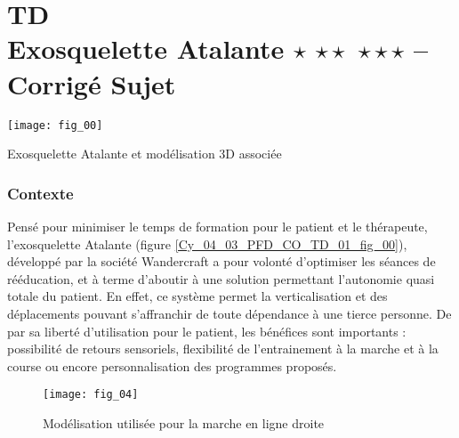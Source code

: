 \chapter*{TD  \\ 
Exosquelette Atalante  \ifnormal $\star$ \else \fi \ifdifficile $\star\star$ \else \fi \iftdifficile $\star\star\star$ \else \fi
-- \ifprof Corrigé \else Sujet \fi}

\iflivret {} \else
\ifprof  {} \else \fi
\fi

\setcounter{question}{0}
\begin{marginfigure}
\texttt{[image: fig\_00]}
\caption{Exosquelette Atalante et modélisation 3D associée \label{Cy_04_03_PFD_CO_TD_01_fig_00}}
\end{marginfigure}


\subsection*{Contexte}

Pensé pour minimiser le temps de formation pour le patient et le thérapeute, l’exosquelette Atalante (figure \ref{Cy_04_03_PFD_CO_TD_01_fig_00}),
 développé par la société Wandercraft a pour volonté d’optimiser les séances de rééducation, et à terme d’aboutir  à une solution permettant l’autonomie quasi totale du patient. En effet, ce système permet la verticalisation et
 des déplacements pouvant s’affranchir de toute dépendance à une tierce personne. De par sa liberté d’utilisation
 pour le patient, les bénéfices sont importants : possibilité de retours sensoriels, flexibilité de l’entrainement à la
 marche et à la course ou encore personnalisation des programmes proposés.


\begin{figure}[!h]
\texttt{[image: fig\_04]}
\caption{Modélisation utilisée pour la marche en ligne droite \label{Cy_04_03_PFD_CO_TD_01_fig_04}}
\end{figure}



